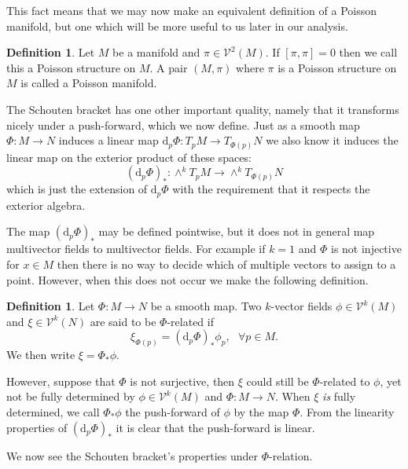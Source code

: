 \documentclass[psamsfonts,12pt]{amsart}
\newcommand\td{\mathrm{d}}
\newcommand\0{\mathbf{0}}
\theoremstyle{plain}
\theoremstyle{definition}
\newtheorem{dfn}[thm]{Definition} %
\newcommand{\sV}{\mathcal{V}}
\begin{document}
This fact means that we may now make an equivalent definition of a Poisson manifold, but one which will be more useful to us later in our analysis.

\begin{dfn}
Let $M$ be a manifold and $\pi \in \sV^2(M)$.  If $[\pi,\pi]=0$ then we call this a Poisson structure on $M$.  A pair $(M,\pi)$ where $\pi$ is a Poisson structure on $M$ is called a Poisson manifold.
\end{dfn}

The Schouten bracket has one other important quality, namely that it transforms nicely under a push-forward, which we now define.  Just as a smooth map $\Phi\colon M\rightarrow N$ induces a linear map $\td_p \Phi \colon T_p M\rightarrow T_{\Phi(p)}N$ we also know it induces the linear map on the exterior product of these spaces:
\[
(\td_p \Phi)_* \colon \wedge^k T_p M \rightarrow \wedge^k T_{\Phi(p)}N
\]
which is just the extension of $\td_p \Phi$ with the requirement that it respects the exterior algebra.

The map $(\td_p \Phi)_*$ may be defined pointwise, but it does not in general map multivector fields to multivector fields.  For example if $k=1$ and $\Phi$ is not injective for $x\in M$ then there is no way to decide which of multiple vectors to assign to a point.  However, when this does not occur we make the following definition.
\begin{dfn}
Let $\Phi\colon M\rightarrow N$ be a smooth map.  Two $k$-vector fields $\phi \in \sV^k(M)$ and $\xi\in \sV^k(N)$ are said to be $\Phi$-related if
\[
\xi_{\Phi(p)}=(\td_p \Phi)_* \phi_p, \ \ \ \forall p\in M.
\]
We then write $\xi=\Phi_*\phi$.
\end{dfn}

However, suppose that $\Phi$ is not surjective, then $\xi$ could still be $\Phi$-related to $\phi$, yet not be fully determined by $\phi\in \sV^k(M)$ and $\Phi\colon M\rightarrow N$.  When $\xi$ \textit{is} fully determined, we call $\Phi_* \phi$ the push-forward of $\phi$ by the map $\Phi$.  From the linearity properties of $(\td_p\Phi)_*$ it is clear that the push-forward is linear.

We now see the Schouten bracket's properties under $\Phi$-relation.
\end{document}
